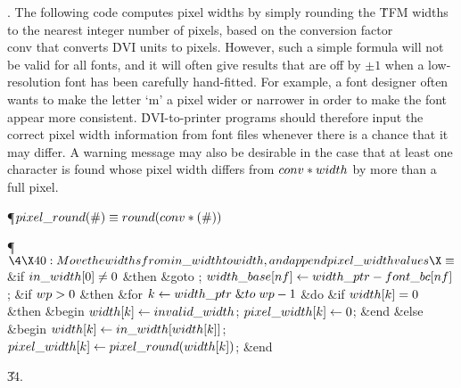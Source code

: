 . The following code computes pixel widths by simply rounding the \.{TFM}
widths to the nearest integer number of pixels, based on the conversion factor
\\{conv} that converts \.{DVI} units to pixels. However, such a simple
formula will not be valid for all fonts, and it will often give results that
are off by $\pm1$ when a low-resolution font has been carefully
hand-fitted. For example, a font designer often wants to make the letter `m'
a pixel wider or narrower in order to make the font appear more consistent.
\.{DVI}-to-printer programs should therefore input the correct pixel width
information from font files whenever there is a chance that it may differ.
A warning message may also be desirable in the case that at least one character
is found whose pixel width differs from $\\{conv}\ast\\{width}$ by more than a
full pixel.

\Y\P\D {}$\\{pixel\_round}(\#)\S\\{round}(\\{conv}\ast(\#))$\par
\Y\P$\4\X40:Move the widths from \\{in\_width} to \\{width}, and append %
\\{pixel\_width} values\X\S$\6
\&{if} $\\{in\_width}[0]\I0$ \1\&{then}\5
\&{goto} ;\2\6
$\\{width\_base}[\\{nf}]\K\\{width\_ptr}-\\{font\_bc}[\\{nf}]$;\6
\&{if} $\\{wp}>0$ \1\&{then}\6
\&{for} $\|k\K\\{width\_ptr}\mathrel{\&{to}}\\{wp}-1$ \1\&{do}\6
\&{if} $\\{width}[\|k]=0$ \1\&{then}\6
\&{begin} $\\{width}[\|k]\K\\{invalid\_width}$;\5
$\\{pixel\_width}[\|k]\K0$;\6
\&{end}\6
\4\&{else} \&{begin} $\\{width}[\|k]\K\\{in\_width}[\\{width}[\|k]]$;\5
$\\{pixel\_width}[\|k]\K\\{pixel\_round}(\\{width}[\|k])$;\6
\&{end}\2\2\2\par
\U34.\fi

